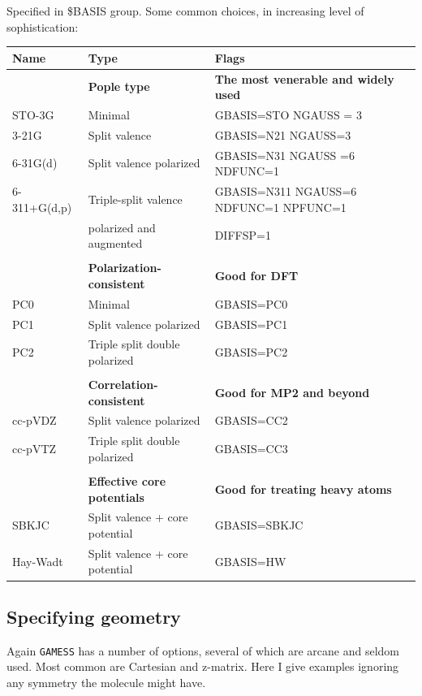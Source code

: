 \documentclass[11pt]{article}
\begin{document}
Specified in \$BASIS group.  Some common choices, in increasing level of sophistication:

\begin{center}
\begin{tabular}{lll}
\hline
Name & Type & Flags\\
\hline
 & \textbf{Pople type} & \textbf{The most venerable and widely used}\\
STO-3G & Minimal & GBASIS=STO  NGAUSS = 3\\
3-21G & Split valence & GBASIS=N21  NGAUSS=3\\
6-31G(d) & Split valence polarized & GBASIS=N31 NGAUSS =6 NDFUNC=1\\
6-311+G(d,p) & Triple-split valence & GBASIS=N311 NGAUSS=6 NDFUNC=1 NPFUNC=1\\
 & polarized and augmented & DIFFSP=1\\
 &  & \\
 & \textbf{Polarization-consistent} & \textbf{Good for DFT}\\
PC0 & Minimal & GBASIS=PC0\\
PC1 & Split valence polarized & GBASIS=PC1\\
PC2 & Triple split double polarized & GBASIS=PC2\\
 &  & \\
 & \textbf{Correlation-consistent} & \textbf{Good for MP2 and beyond}\\
cc-pVDZ & Split valence polarized & GBASIS=CC2\\
cc-pVTZ & Triple split double polarized & GBASIS=CC3\\
 &  & \\
 & \textbf{Effective core potentials} & \textbf{Good for treating heavy atoms}\\
SBKJC & Split valence + core potential & GBASIS=SBKJC\\
Hay-Wadt & Split valence + core potential & GBASIS=HW\\
\hline
\end{tabular}
\end{center}

\subsection{Specifying geometry}
\label{sec:org7fe99a0}
Again \texttt{GAMESS} has a number of options, several of which are arcane and seldom used.  Most common are Cartesian and z-matrix.  Here I give examples ignoring any symmetry the molecule might have.
\end{document}
